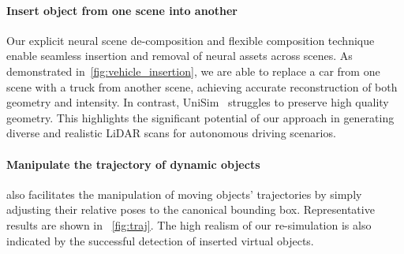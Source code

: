 
\paragraph{Insert object from one scene into another}
Our explicit neural scene de-composition and flexible composition technique enable seamless insertion and removal of neural assets across scenes. As demonstrated in~\cref{fig:vehicle_insertion}, we are able to replace a car from one scene with a truck from another scene, achieving accurate reconstruction of both geometry and intensity. In contrast, UniSim~\cite{yang2023unisim} struggles to preserve high quality geometry. This highlights the significant potential of our approach in generating diverse and realistic LiDAR scans for autonomous driving scenarios.


\paragraph{Manipulate the trajectory of dynamic objects}
\dynfl also facilitates the manipulation of moving objects' trajectories by simply adjusting their relative poses to the canonical bounding box. Representative results are shown in ~\cref{fig:traj}. The high realism of our re-simulation is also indicated by the successful detection of inserted virtual objects.

